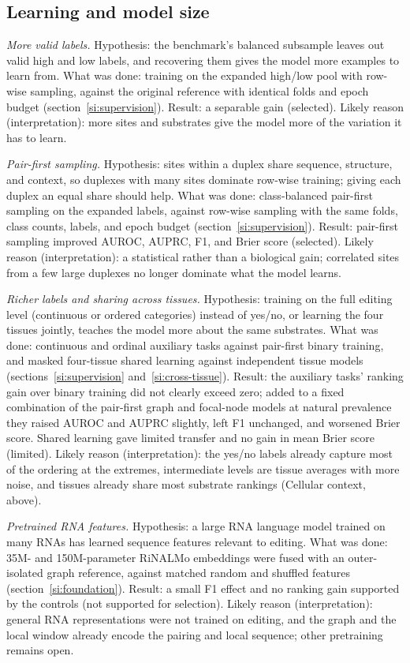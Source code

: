 \documentclass[9pt,twoside]{pnas-new}
\begin{document}
\subsection*{Learning and model size}

\textit{More valid labels.} Hypothesis: the benchmark's balanced subsample leaves out valid high and low labels, and recovering them gives the model more examples to learn from. What was done: training on the expanded high/low pool with row-wise sampling, against the original reference with identical folds and epoch budget (section~\ref{si:supervision}). Result: a separable gain (selected). Likely reason (interpretation): more sites and substrates give the model more of the variation it has to learn.

\textit{Pair-first sampling.} Hypothesis: sites within a duplex share sequence, structure, and context, so duplexes with many sites dominate row-wise training; giving each duplex an equal share should help. What was done: class-balanced pair-first sampling on the expanded labels, against row-wise sampling with the same folds, class counts, labels, and epoch budget (section~\ref{si:supervision}). Result: pair-first sampling improved AUROC, AUPRC, F1, and Brier score (selected). Likely reason (interpretation): a statistical rather than a biological gain; correlated sites from a few large duplexes no longer dominate what the model learns.

\textit{Richer labels and sharing across tissues.} Hypothesis: training on the full editing level (continuous or ordered categories) instead of yes/no, or learning the four tissues jointly, teaches the model more about the same substrates. What was done: continuous and ordinal auxiliary tasks against pair-first binary training, and masked four-tissue shared learning against independent tissue models (sections~\ref{si:supervision} and~\ref{si:cross-tissue}). Result: the auxiliary tasks' ranking gain over binary training did not clearly exceed zero; added to a fixed combination of the pair-first graph and focal-node models at natural prevalence they raised AUROC and AUPRC slightly, left F1 unchanged, and worsened Brier score. Shared learning gave limited transfer and no gain in mean Brier score (limited). Likely reason (interpretation): the yes/no labels already capture most of the ordering at the extremes, intermediate levels are tissue averages with more noise, and tissues already share most substrate rankings (Cellular context, above).

\textit{Pretrained RNA features.} Hypothesis: a large RNA language model trained on many RNAs has learned sequence features relevant to editing. What was done: 35M- and 150M-parameter RiNALMo embeddings were fused with an outer-isolated graph reference, against matched random and shuffled features (section~\ref{si:foundation}). Result: a small F1 effect and no ranking gain supported by the controls (not supported for selection). Likely reason (interpretation): general RNA representations were not trained on editing, and the graph and the local window already encode the pairing and local sequence; other pretraining remains open.
\end{document}
